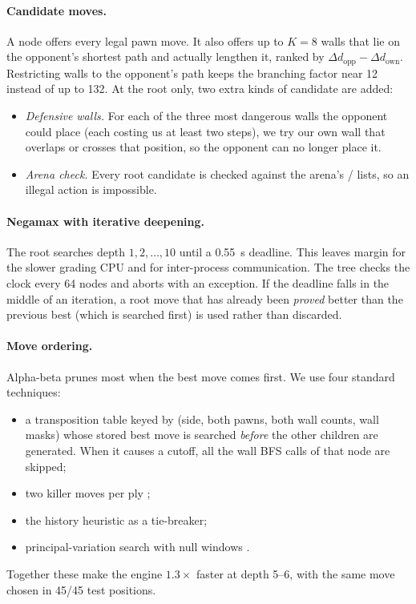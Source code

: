 \paragraph{Candidate moves.}
A node offers every legal pawn move. It also offers up to $K = 8$ walls that lie on the
opponent's shortest path and actually lengthen it, ranked by $\Delta d_{\text{opp}} -
\Delta d_{\text{own}}$. Restricting walls to the opponent's path keeps the branching factor near
12 instead of up to 132.
At the root only, two extra kinds of candidate are added:
\begin{itemize}
  \item \emph{Defensive walls.} For each of the three most dangerous walls the opponent could
        place (each costing us at least two steps), we try our own wall that overlaps or crosses
        that position, so the opponent can no longer place it.
  \item \emph{Arena check.} Every root candidate is checked against the arena's
        / lists, so an illegal action is impossible.
\end{itemize}

\paragraph{Negamax with iterative deepening.}
The root searches depth $1, 2, \dots, 10$ until a \SI{0.55}{\second} deadline. This leaves margin
for the slower grading CPU and for inter-process communication. The tree checks the clock every
64 nodes and aborts with an exception. If the deadline falls in the middle of an iteration, a
root move that has already been \emph{proved} better than the previous best (which is searched
first) is used rather than discarded.

\paragraph{Move ordering.}
Alpha-beta prunes most when the best move comes first. We use four standard techniques:
\begin{itemize}
  \item a transposition table keyed by (side, both pawns, both wall counts, wall masks) whose
        stored best move is searched \emph{before} the other children are generated. When it
        causes a cutoff, all the wall BFS calls of that node are skipped;
  \item two killer moves per ply \citep{akl1977killer};
  \item the history heuristic \citep{schaeffer1989history} as a tie-breaker;
  \item principal-variation search with null windows \citep{marsland1982pvs}.
\end{itemize}
Together these make the engine $1.3\times$ faster at depth 5--6, with the same move chosen in
45/45 test positions.

